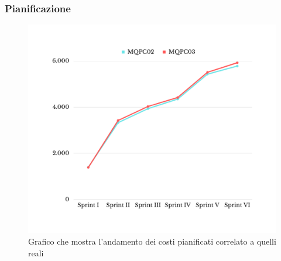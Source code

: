 \subsubsection{Pianificazione}
\begin{figure}[H]
	\centering
	\includegraphics[scale=0.5]{img/BCWS-ACWS.png}
	\caption{Grafico che mostra l'andamento dei costi pianificati correlato a quelli reali}
\end{figure}
